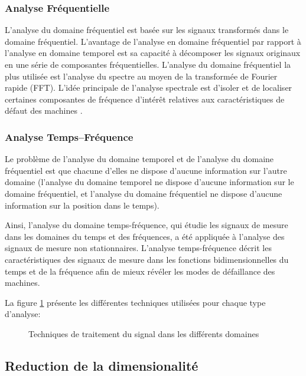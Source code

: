 \subsubsection{Analyse Fréquentielle}
L'analyse du domaine fréquentiel est basée sur les signaux transformés dans le domaine fréquentiel. L'avantage de l'analyse en domaine fréquentiel par rapport à l'analyse en domaine temporel est sa capacité à décomposer les signaux originaux en une série de composantes fréquentielles. L'analyse du domaine fréquentiel la plus utilisée est l'analyse du spectre au moyen de la transformée de Fourier rapide (FFT). L'idée principale de l'analyse spectrale est d'isoler et de localiser certaines composantes de fréquence d'intérêt relatives aux caractéristiques de défaut des machines \cite{Lei2016a}.


\subsubsection{Analyse Temps–Fréquence}
Le problème de l'analyse du domaine temporel et de l'analyse du domaine fréquentiel est que chacune d'elles ne dispose d'aucune information sur l'autre domaine (l'analyse du domaine temporel ne dispose d'aucune information sur le domaine fréquentiel, et l'analyse du domaine fréquentiel ne dispose d'aucune information sur la position dans le temps).

Ainsi, l'analyse du domaine temps-fréquence, qui
étudie les signaux de mesure dans les domaines du temps et des fréquences, a été appliquée à l'analyse des signaux de mesure non stationnaires. L'analyse temps-fréquence décrit les caractéristiques des signaux de mesure dans les fonctions bidimensionnelles du temps et de la fréquence afin de mieux révéler les modes de défaillance des machines.


La figure \ref{fig:signal-processing} présente les différentes techniques utilisées pour chaque type d'analyse:

\begin{figure}[h]
    \centering
	
    \caption{Techniques de traitement du signal dans les différents domaines}
    \label{fig:signal-processing}
\end{figure}

\subsection{Reduction de la dimensionalité}

